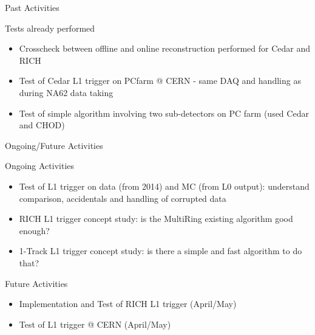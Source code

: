 \begin{frame}{Past Activities}{}
	\begin{block}{Tests already performed}
		\begin{itemize}
		  \item Crosscheck between offline and online reconstruction performed for
		  Cedar and RICH
		  \item Test of Cedar L1 trigger on PCfarm @ CERN - same DAQ and handling as during NA62
data taking
		  \item Test of simple algorithm involving two sub-detectors on PC farm (used Cedar and CHOD)
		\end{itemize}
	\end{block}
\end{frame}

\begin{frame}{Ongoing/Future Activities}{}
	\begin{block}{Ongoing Activities}
		\begin{itemize}
		  \item Test of L1 trigger on data (from 2014) and MC (from L0 output): understand comparison,
			accidentals and handling of corrupted data
			\item RICH L1 trigger concept study: is the MultiRing existing algorithm good
			enough?
			\item 1-Track L1 trigger concept study: is there a simple and fast algorithm to
			do that?
		\end{itemize}
	\end{block}
	
	\begin{block}{Future Activities}
		\begin{itemize}
			\item Implementation and Test of RICH L1 trigger (April/May)
			\item Test of L1 trigger @ CERN (April/May)
		\end{itemize}
	\end{block}

\end{frame}